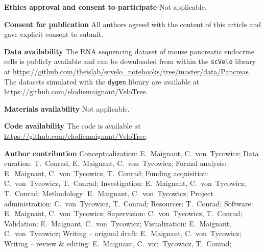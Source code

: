 \documentclass[pdflatex,sn-mathphys-num]{sn-jnl}%
\theoremstyle{thmstyleone}%
\theoremstyle{thmstyletwo}%
\theoremstyle{thmstylethree}%
\begin{document}
\medbreak
\noindent\textbf{Ethics approval and consent to participate}
Not applicable.

\medbreak
\noindent\textbf{Consent for publication}
All authors agreed with the content of this article and gave explicit consent to submit.

\medbreak
\noindent\textbf{Data availability}
The RNA sequencing dataset of mouse pancreatic endocrine cells is publicly available and can be downloaded from within the \texttt{scVelo} library at \url{https://github.com/theislab/scvelo_notebooks/tree/master/data/Pancreas}. The datasets simulated with the \texttt{dygen} library are available at \url{https://github.com/elodiemaignant/VeloTree}.

\medbreak
\noindent\textbf{Materials availability}
Not applicable.

\medbreak
\noindent\textbf{Code availability} The code is available at \url{https://github.com/elodiemaignant/VeloTree}.

\medbreak
\noindent\textbf{Author contribution}
Conceptualization: E.~Maignant, C.~von~Tycowicz;
Data curation: T.~Conrad, E.~Maignant, C.~von~Tycowicz;
Formal analysis: E.~Maignant, C.~von~Tycowicz, T.~Conrad;
Funding acquisition: C.~von~Tycowicz, T.~Conrad;
Investigation: E.~Maignant, C.~von~Tycowicz, T.~Conrad;
Methodology: E.~Maignant, C.~von~Tycowicz;
Project administration: C.~von~Tycowicz, T.~Conrad;
Resources: T.~Conrad;
Software: E.~Maignant, C.~von~Tycowicz;
Supervision: C.~von~Tycowicz, T.~Conrad;
Validation: E.~Maignant, C.~von~Tycowicz;
Visualization: E.~Maignant, C.~von~Tycowicz;
Writing – original draft: E.~Maignant, C.~von~Tycowicz;
Writing – review \& editing: E.~Maignant, C.~von~Tycowicz, T.~Conrad;




\end{document}
